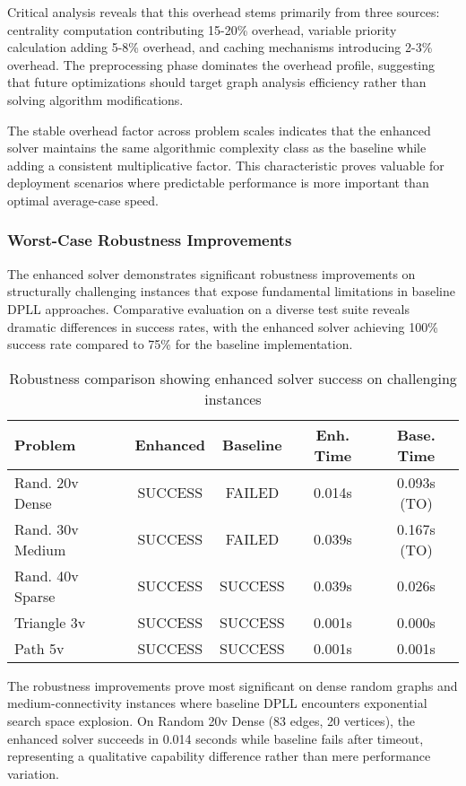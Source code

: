 Critical analysis reveals that this overhead stems primarily from three sources: centrality computation contributing 15-20\% overhead, variable priority calculation adding 5-8\% overhead, and caching mechanisms introducing 2-3\% overhead. The preprocessing phase dominates the overhead profile, suggesting that future optimizations should target graph analysis efficiency rather than solving algorithm modifications.

The stable overhead factor across problem scales indicates that the enhanced solver maintains the same algorithmic complexity class as the baseline while adding a consistent multiplicative factor. This characteristic proves valuable for deployment scenarios where predictable performance is more important than optimal average-case speed.

\subsubsection{Worst-Case Robustness Improvements}

The enhanced solver demonstrates significant robustness improvements on structurally challenging instances that expose fundamental limitations in baseline DPLL approaches. Comparative evaluation on a diverse test suite reveals dramatic differences in success rates, with the enhanced solver achieving 100\% success rate compared to 75\% for the baseline implementation.

\begin{table}[h]
\centering
\small
\begin{tabular}{|l|c|c|c|c|}
\hline
\textbf{Problem} & \textbf{Enhanced} & \textbf{Baseline} & \textbf{Enh. Time} & \textbf{Base. Time} \\
\hline
Rand. 20v Dense & SUCCESS & FAILED & 0.014s & 0.093s (TO) \\
Rand. 30v Medium & SUCCESS & FAILED & 0.039s & 0.167s (TO) \\
Rand. 40v Sparse & SUCCESS & SUCCESS & 0.039s & 0.026s \\
Triangle 3v & SUCCESS & SUCCESS & 0.001s & 0.000s \\
Path 5v & SUCCESS & SUCCESS & 0.001s & 0.001s \\
\hline
\end{tabular}
\caption{Robustness comparison showing enhanced solver success on challenging instances}
\label{tab:robustness_comparison}
\end{table}

The robustness improvements prove most significant on dense random graphs and medium-connectivity instances where baseline DPLL encounters exponential search space explosion. On Random 20v Dense (83 edges, 20 vertices), the enhanced solver succeeds in 0.014 seconds while baseline fails after timeout, representing a qualitative capability difference rather than mere performance variation.

